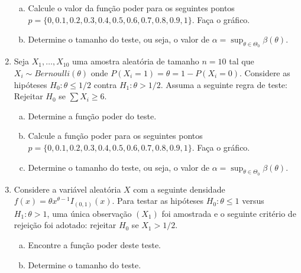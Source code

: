 \documentclass[10pt,brazil,addpoints]{exam}
\begin{document}
\begin{enumerate}[1.]
\begin{enumerate}[a)]
 \item Calcule o valor da função poder para os seguintes pontos $p = \{0, 0.1, 0.2, 0.3, 0.4, 0.5, 0.6, 0.7, 0.8, 0.9, 1\}$. Faça o gráfico.
 
 \item Determine o tamanho do teste, ou seja, o valor de $\alpha = \sup_{\theta \in\Theta_0} \beta(\theta)$.
 
\end{enumerate}

\item Seja $X_1, \ldots, X_{10} $ uma amostra aleatória de tamanho $n = 10$ tal que $X_i \sim Bernoulli(\theta)$ onde $P(X_i = 1) = \theta = 1 - P(X_i = 0)$. Considere as hipóteses $H_0 : \theta \leq 1/2$ contra $H_1 : \theta > 1/2$. Assuma a seguinte regra de teste: Rejeitar $H_0$ se $\sum X_i \geq 6$.


\begin{enumerate}[a)]
 \item Determine a função poder do teste.
 \item Calcule a função poder para os seguintes pontos $p = \{0, 0.1, 0.2, 0.3, 0.4, 0.5, 0.6, 0.7, 0.8, 0.9, 1\}$. Faça o gráfico.
 \item Determine o tamanho do teste, ou seja, o valor de $\alpha = \sup_{\theta \in\Theta_0} \beta(\theta)$.
\end{enumerate}

\item Considere a variável aleatória $X$ com a seguinte densidade $f(x) = \theta x^{\theta-1}I_{(0,1)}(x)$. Para testar as hipóteses $H_0 : \theta \leq 1$ versus $H_1: \theta > 1$, uma única observação $(X_1)$ foi amostrada e o seguinte critério de rejeição foi adotado: rejeitar $H_0$ se $X_1 > 1/2$.

\begin{enumerate}[a)]
 \item Encontre a função poder deste teste.
 \item Determine o tamanho do teste.
\end{enumerate}



\end{enumerate}
\end{document}
